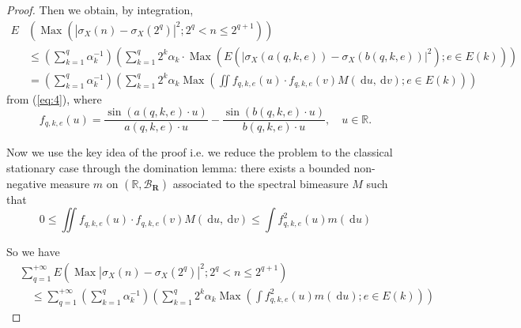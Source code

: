 \documentclass{article}
\theoremstyle{definition}
\begin{document}
\begin{proof}
Then we obtain, by integration,
\begin{equation}\label{eq:20}
\begin{aligned}
E&\left(\operatorname{Max}\left(\left|\sigma_{X}(n)-\sigma_{X}\left(2^{q}\right)\right|^{2} ; 2^{q}<n \leqslant 2^{q+1}\right)\right) \\
&\leqslant\left(\sum_{k=1}^{q} \alpha_{k}^{-1}\right)\left(\sum_{k=1}^{q} 2^{k} \alpha_{k} \cdot \operatorname{Max}\left(E\left(\left|\sigma_{X}(a(q, k, e))-\sigma_{X}(b(q, k, e))\right|^{2}\right) ; e \in E(k)\right)\right) \\
&=\left(\sum_{k=1}^{q} \alpha_{k}^{-1}\right)\left(\sum_{k=1}^{q} 2^{k} \alpha_{k} \operatorname{Max}\left(\iint f_{q, k, e}(u) \cdot f_{q, k, e}(v) M(\mathrm{~d} u, \mathrm{~d} v) ; e \in E(k)\right)\right)
\end{aligned}
\end{equation}
from (\ref{eq:4}), where
\begin{equation}\label{eq:21}
f_{q, k, e}(u)=\frac{\sin (a(q, k, e) \cdot u)}{a(q, k, e) \cdot u}-\frac{\sin (b(q, k, e) \cdot u)}{b(q, k, e) \cdot u}, \quad u \in \mathbb{R}.
\end{equation}

Now we use the key idea of the proof i.e. we reduce the problem to the classical stationary case through the domination lemma: there exists a bounded non-negative measure $m$ on $(\mathbb{R}, \mathscr{B}_{\mathbf{R}})$ associated to the spectral bimeasure $M$ such that
\begin{equation}\label{eq:22}
0 \leqslant \iint f_{q, k, e}(u) \cdot f_{q, k, e}(v) M(\mathrm{~d} u, \mathrm{~d} v) \leqslant \int f_{q, k, e}^{2}(u) m(\mathrm{~d} u)
\end{equation}

So we have
\begin{equation}\label{eq:23}
\begin{aligned}
&\sum_{q=1}^{+\infty} E\left(\operatorname{Max}\left|\sigma_{X}(n)-\sigma_{X}\left(2^{q}\right)\right|^{2} ; 2^{q}<n \leqslant 2^{q+1}\right) \\
&\quad \leqslant \sum_{q=1}^{+\infty}\left(\sum_{k=1}^{q} \alpha_{k}^{-1}\right)\left(\sum_{k=1}^{q} 2^{k} \alpha_{k} \operatorname{Max}\left(\int f_{q, k, e}^{2}(u) m(\mathrm{~d} u) ; e \in E(k)\right)\right)
\end{aligned}
\end{equation}


\end{proof}
\end{document}

